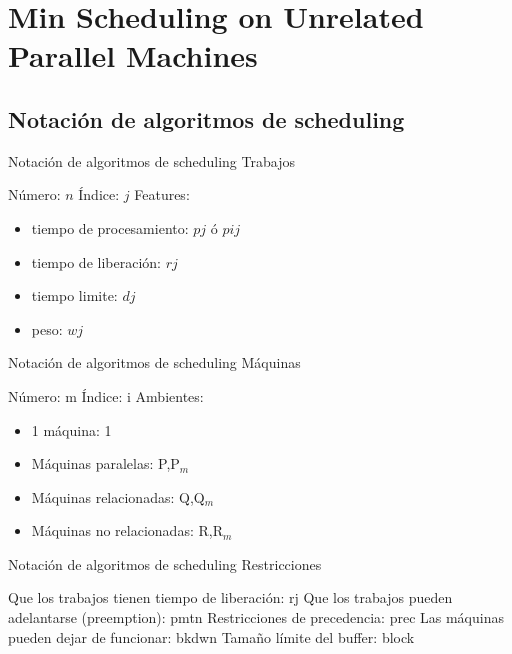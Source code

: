 \renewcommand{\sectiontitle}{Min Scheduling on Unrelated Parallel Machines}
\section{\sectiontitle}

\renewcommand{\subsectiontitle}{Notación de algoritmos de scheduling}
\subsection{\subsectiontitle}

\begin{frame}{\subsectiontitle}
    Trabajos
    \begin{itemize}
        \itemj Número: $n$
        \itemj Índice: $j$
        \itemj Features:
        \begin{itemize}
            \item tiempo de procesamiento: $pj$ ó $pij$
            \item tiempo de liberación: $rj$
            \item tiempo limite: $dj$
            \item peso: $wj$
        \end{itemize}
    \end{itemize}
\end{frame}

\begin{frame}{\subsectiontitle}
    Máquinas
    \begin{itemize}
        \itemj Número: m
        \itemj Índice: i
        \itemj Ambientes:
        \begin{itemize}
            \item 1 máquina: 1
            \item Máquinas paralelas: P,P$_m$
            \item Máquinas relacionadas: Q,Q$_m$
            \item Máquinas no relacionadas: R,R$_m$        \end{itemize}
    \end{itemize}
\end{frame}

\begin{frame}{\subsectiontitle}
    Restricciones
    \begin{itemize}
        \itemj Que los trabajos tienen tiempo de liberación: rj
        \itemj Que los trabajos pueden adelantarse (preemption): pmtn
        \itemj Restricciones de precedencia: prec
        \itemj Las máquinas pueden dejar de funcionar: bkdwn
        \itemj Tamaño límite del buffer: block
         
    \end{itemize}
\end{frame}

